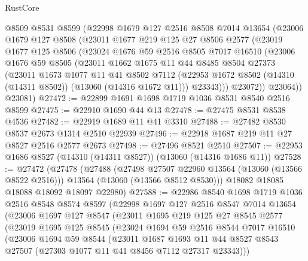 \begin{lexlean}{RustCore}
\begin{coremodule}
    @8509
    @8531
    @8599
    (@22998
      @1679
      @127
      @2516
      @8508
      @7014
      @13654
      (@23006
        @1679
        @127
        @8508
        (@23011
          @1677
          @219
          @125
          @27
          @8506
          @2577
          (@23019
            @1677
            @125
            @8506
            (@23024
              @1676
              @59
              @2516
              @8505
              @7017
              @16510
              (@23006
                @1676
                @59
                @8505
                (@23011
                  @1662
                  @1675
                  @11
                  @44
                  @8485
                  @8504
                  @27373
                  (@23011
                    @1673
                    @1077
                    @11
                    @41
                    @8502
                    @7112
                    (@22953 @1672 @8502 (@14310 (@14311 @8502)) (@13060 (@14316 @1672 @11)))
                    @23343)))
              @23072))
          @23064))
      @23081)
@27472 := @22899 @1691 @1698 @1719 @1036 @8531 @8540 @2516 @8599
@27475 := @22910 @1690 @44 @13
@27478 := @27475 @8531 @8538 @4536
@27482 := @22919 @1689 @11 @41 @3310
@27488 := @27482 @8530 @8537 @2673 @1314 @2510 @22939
@27496 := @22918 @1687 @219 @11 @27 @8527 @2516 @2577 @2673
@27498 := @27496 @8521 @2510
@27507 := @22953 @1686 @8527 (@14310 (@14311 @8527)) (@13060 (@14316 @1686 @11))
@27528 := @27472
    (@27478
      (@27488
        (@27498 @27507 @22960 @13564 (@13060 (@13566 @8522 @2516)))
        @13564
        (@13060 (@13566 @8512 @8530)))
      @18082
      @18085
      @18088
      @18092
      @18097
      @22980)
@27588 := @22986
    @8540
    @1698
    @1719
    @1036
    @2516
    @8548
    @8574
    @8597
    (@22998
      @1697
      @127
      @2516
      @8547
      @7014
      @13654
      (@23006
        @1697
        @127
        @8547
        (@23011
          @1695
          @219
          @125
          @27
          @8545
          @2577
          (@23019
            @1695
            @125
            @8545
            (@23024
              @1694
              @59
              @2516
              @8544
              @7017
              @16510
              (@23006
                @1694
                @59
                @8544
                (@23011
                  @1687
                  @1693
                  @11
                  @44
                  @8527
                  @8543
                  @27507
                  (@27303 @1077 @11 @41 @8456 @7112 @27317 @23343)))

\end{coremodule}
\end{lexlean}
